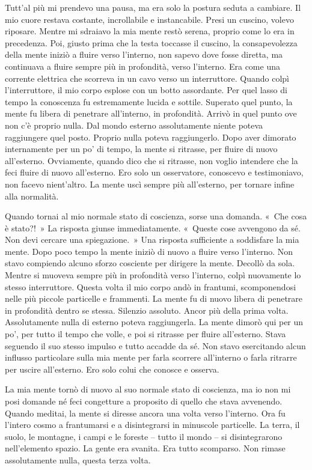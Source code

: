 Tutt'al più mi prendevo una pausa, ma era solo la postura seduta a
cambiare. Il mio cuore restava costante, incrollabile e instancabile.
Presi un cuscino, volevo riposare. Mentre mi sdraiavo la mia mente restò
serena, proprio come lo era in precedenza. Poi, giusto prima che la
testa toccasse il cuscino, la consapevolezza della mente iniziò a fluire
verso l'interno, non sapevo dove fosse diretta, ma continuava a fluire
sempre più in profondità, verso l'interno. Era come una corrente
elettrica che scorreva in un cavo verso un interruttore. Quando colpì
l'interruttore, il mio corpo esplose con un botto assordante. Per quel
lasso di tempo la conoscenza fu estremamente lucida e sottile. Superato
quel punto, la mente fu libera di penetrare all'interno, in profondità.
Arrivò in quel punto ove non c'è proprio nulla. Dal mondo esterno
assolutamente niente poteva raggiungere quel posto. Proprio nulla poteva
raggiungerlo. Dopo aver dimorato internamente per un po' di tempo, la
mente si ritrasse, per fluire di nuovo all'esterno. Ovviamente, quando
dico che si ritrasse, non voglio intendere che la feci fluire di nuovo
all'esterno. Ero solo un osservatore, conoscevo e testimoniavo, non
facevo nient'altro. La mente uscì sempre più all'esterno, per tornare
infine alla normalità.

Quando tornai al mio normale stato di coscienza, sorse una domanda.
«~Che cosa è stato?!~» La risposta giunse immediatamente. «~Queste cose
avvengono da sé. Non devi cercare una spiegazione.~» Una risposta
sufficiente a soddisfare la mia mente. Dopo poco tempo la mente iniziò
di nuovo a fluire verso l'interno. Non stavo compiendo alcuno sforzo
cosciente per dirigere la mente. Decollò da sola. Mentre si muoveva
sempre più in profondità verso l'interno, colpì nuovamente lo stesso
interruttore. Questa volta il mio corpo andò in frantumi, scomponendosi
nelle più piccole particelle e frammenti. La mente fu di nuovo libera di
penetrare in profondità dentro se stessa. Silenzio assoluto. Ancor più
della prima volta. Assolutamente nulla di esterno poteva raggiungerla.
La mente dimorò qui per un po', per tutto il tempo che volle, e poi si
ritrasse per fluire all'esterno. Stava seguendo il suo stesso impulso e
tutto accadde da sé. Non stavo esercitando alcun influsso particolare
sulla mia mente per farla scorrere all'interno o farla ritrarre per
uscire all'esterno. Ero solo colui che conosce e osserva.

La mia mente tornò di nuovo al suo normale stato di coscienza, ma io non
mi posi domande né feci congetture a proposito di quello che stava
avvenendo. Quando meditai, la mente si diresse ancora una volta verso
l'interno. Ora fu l'intero cosmo a frantumarsi e a disintegrarsi in
minuscole particelle. La terra, il suolo, le montagne, i campi e le
foreste -- tutto il mondo -- si disintegrarono nell'elemento spazio. La
gente era svanita. Era tutto scomparso. Non rimase assolutamente nulla,
questa terza volta.

